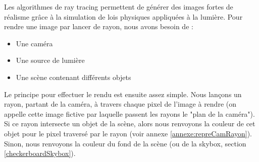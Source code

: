 \documentclass[../../Rapport RayTracer.tex]{subfiles}
\begin{document}
Les algorithmes de ray tracing permettent de générer des images fortes de réalisme grâce à la simulation de lois physiques appliquées à la lumière. Pour rendre une image par lancer de rayon, nous avons besoin de :
\begin{itemize}
	\item {Une caméra}
	\item {Une source de lumière}
	\item{Une scène contenant différents objets}
\end{itemize}
Le principe pour effectuer le rendu est ensuite assez simple. Nous lançons un rayon, partant de la caméra, à travers chaque pixel de l'image à rendre (on appelle cette image fictive par laquelle passent les rayons le "plan de la caméra"). Si ce rayon intersecte un objet de la scène, alors nous renvoyons la couleur de cet objet pour le pixel traversé par le rayon (voir annexe \ref{annexe:repreCamRayon}). Sinon, nous renvoyons la couleur du fond de la scène (ou de la skybox, section \ref{checkerboardSkybox}).
\end{document}
